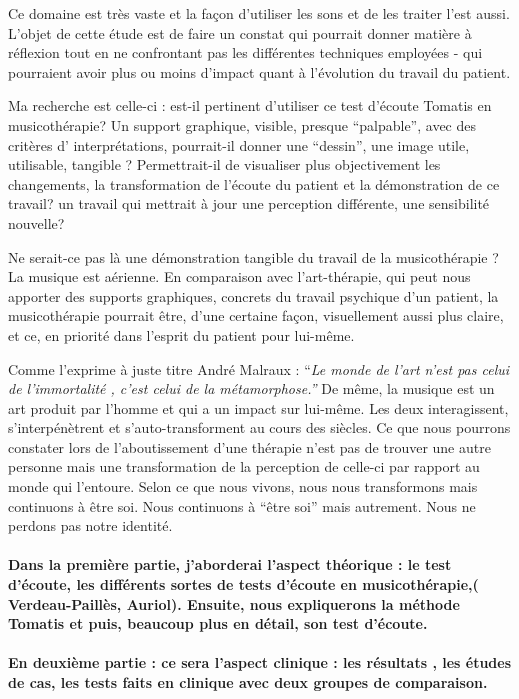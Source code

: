 \documentclass[12pt,french]{report}
\begin{document}
Ce domaine est très vaste et la façon d'utiliser les sons et de les
traiter l'est aussi. L'objet de cette étude est de faire un constat
qui pourrait donner matière à réflexion tout en ne confrontant pas
les différentes techniques employées - qui pourraient avoir plus ou
moins d'impact quant à l'évolution du travail du patient.

Ma recherche est celle-ci : est-il pertinent d'utiliser ce test d'écoute
Tomatis en musicothérapie? Un support graphique, visible, presque
``palpable'', avec des critères d' interprétations, pourrait-il
donner une ``dessin'', une image utile, utilisable, tangible ? Permettrait-il
de visualiser plus objectivement les changements, la transformation
de l'écoute du patient et la démonstration de ce travail? un travail
qui mettrait à jour une perception différente, une sensibilité nouvelle?

Ne serait-ce pas là une démonstration tangible du travail de la musicothérapie
? La musique est aérienne. En comparaison avec l'art-thérapie, qui
peut nous apporter des supports graphiques, concrets du travail psychique
d'un patient, la musicothérapie pourrait être, d'une certaine façon,
visuellement aussi plus claire, et ce, en priorité dans l'esprit du
patient pour lui-même. 

Comme l'exprime à juste titre André Malraux : ``\emph{Le monde de
l'art n'est pas celui de l'immortalité , c'est celui de la métamorphose.''}
De même, la musique est un art produit par l'homme et qui a un impact
sur lui-même. Les deux interagissent, s'interpénètrent et s'auto-transforment
au cours des siècles. Ce que nous pourrons constater lors de l'aboutissement
d'une thérapie n'est pas de trouver une autre personne mais une transformation
de la perception de celle-ci par rapport au monde qui l'entoure. Selon
ce que nous vivons, nous nous transformons mais continuons à être
soi. Nous continuons à ``être soi'' mais autrement. Nous ne perdons
pas notre identité.


\paragraph{{\tiny{\normalsize  Dans la première partie, j'aborderai l'aspect théorique : le test}}
d'écoute, les différents sortes de tests d'écoute en musicothérapie,(
Verdeau-Paillès, Auriol). Ensuite, nous expliquerons la méthode Tomatis
et puis, beaucoup plus en détail, son test d'écoute. }

\paragraph{En deuxième partie : ce sera l'aspect clinique : les résultats ,
les études de cas, les tests faits en clinique avec deux groupes de
comparaison.}
\end{document}
